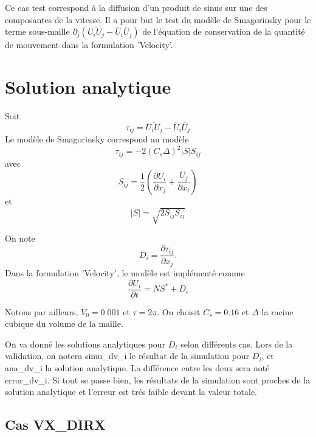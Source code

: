Ce cas test correspond \`a la diffusion d'un produit de sinus sur une des composantes de la vitesse. Il a pour but le test du mod\`ele de Smagorinsky pour le terme sous-maille $\partial_j\left(\overline{U_i U_j} - \overline{U}_i\overline{U}_j\right)$ de l'\'equation de conservation de la quantit\'e de mouvement dans la formulation 'Velocity'.

\section{Solution analytique}

Soit
\begin{equation}
\tau_{ij} = \overline{U_i U_j} - \overline{U}_i\overline{U}_j
\end{equation}
Le mod\`ele de Smagorinsky correspond au mod\`ele
\begin{equation}
\tau_{ij} = - 2 \left(C_s \Delta\right)^2 \left|S\right| S_{ij}
\end{equation}
avec
\begin{equation}
S_{ij} = \frac{1}{2}\left(\frac{\partial U_i}{\partial x_j} + \frac{U_j}{\partial x_i}\right)
\end{equation}
et
\begin{equation}
\left|S\right| = \sqrt{2 S_{ij} S_{ij}}
\end{equation}

On note
\begin{equation}
D_i = \frac{\partial \tau_{ij}}{\partial x_j}.
\end{equation}
Dans la formulation 'Velocity', le mod\`ele est impl\'ement\'e comme
\begin{equation}
\frac{\partial U_{i}}{\partial t} = NS^* + D_i
\end{equation}

Notons par ailleurs, $V_0 = 0.001$ et $\tau=2\pi$. On choisit $C_s=0.16$ et $\Delta$ la racine cubique du volume de la maille.

On va donn\'e les solutions analytiques pour $D_i$ selon diff\'erents cas.
Lors de la validation, on notera {\textsf simu\_dv\_i} le r\'esultat de la
simulation pour $D_i$, et {\textsf ana\_dv\_i} la solution analytique.
La diff\'erence entre les deux sera not\'e \textsf{error\_dv\_i}. Si tout se passe bien, les r\'esultats de la simulation sont proches de la solution analytique et l'erreur est tr\'es faible devant la valeur totale.



\subsection{Cas VX\_DIRX}

